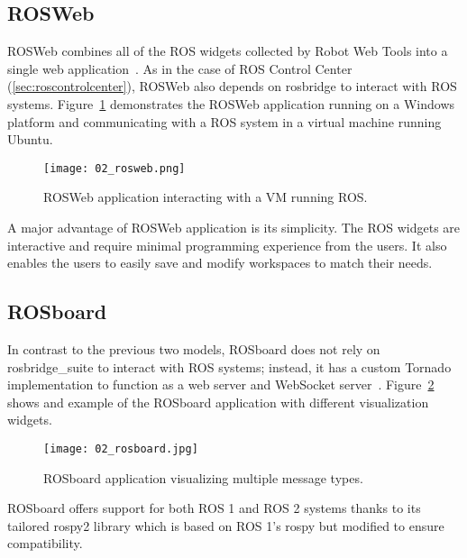     \subsection{ROSWeb}

        ROSWeb combines all of the \ac{ROS} widgets collected by Robot Web Tools into a single web application~\cite{rosweb}. As in the case of ROS Control Center (\ref{sec:roscontrolcenter}), ROSWeb also depends on \textsf{rosbridge} to interact with \ac{ROS} systems. Figure~\ref{fig:rosweb} demonstrates the ROSWeb application running on a Windows platform and communicating with a \ac{ROS} system in a virtual machine running Ubuntu.

        \begin{figure}[htbp]
            \centering
            \texttt{[image: 02\_rosweb.png]}
            \caption{ROSWeb application interacting with a \ac{VM} running \ac{ROS}.}
            \label{fig:rosweb}
        \end{figure}

        A major advantage of ROSWeb application is its simplicity. The \ac{ROS} widgets are interactive and require minimal programming experience from the users. It also enables the users to easily save and modify workspaces to match their needs.

    \subsection{ROSboard}

        In contrast to the previous two models, ROSboard does not rely on \textsf{rosbridge\_suite} to interact with \ac{ROS} systems; instead, it has a custom \textsf{Tornado} implementation to function as a web server and WebSocket server~\cite{rosboard}. Figure~\ref{fig:rosboard} shows and example of the ROSboard application with different visualization widgets.

        \begin{figure}[htbp]
            \centering
            \texttt{[image: 02\_rosboard.jpg]}
            \caption{ROSboard application visualizing multiple message types.}
            \label{fig:rosboard}
        \end{figure}

        ROSboard offers support for both \ac{ROS} 1 and \ac{ROS} 2 systems thanks to its tailored \textsf{rospy2} library which is based on \ac{ROS} 1's \textsf{rospy} but modified to ensure compatibility.

